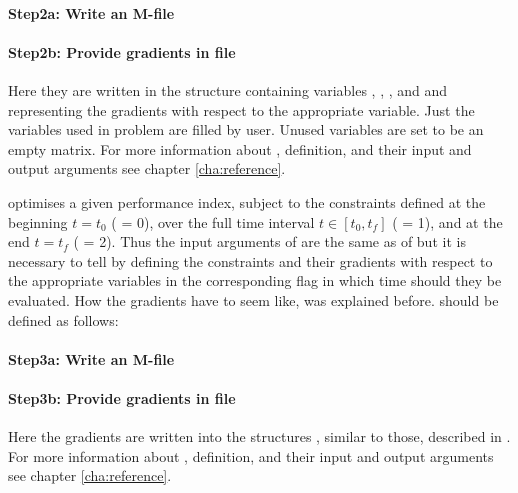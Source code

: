 \paragraph{Step2a: Write an M-file~}

{\small }

\paragraph{Step2b: Provide gradients in file~}

{\small }

Here they are written in the structure  containing
variables , , , and  and
representing the gradients with respect to the appropriate
variable. Just the variables used in problem are filled by
user. Unused variables are set to be an empty matrix. For more
information about ,  definition, and their
input and output arguments see chapter \ref{cha:reference}.

 optimises a given performance index, subject to the
constraints defined at the beginning $t =
t_{0}$ ( = 0), over the full time interval $t \in
[t_{0},t_{f}]$ ( = 1), and at the end $t = t_{f}$
( = 2). Thus the input arguments of  are the
same as of  but it is necessary to tell  by
defining the constraints and their gradients with respect to the
appropriate variables in the corresponding flag in which time should
they be evaluated. How the gradients have to seem like, was explained
before.  should be defined as follows:  
 
\paragraph{Step3a: Write an M-file~}

{\small }

\paragraph{Step3b: Provide gradients in file~}

{\small }

Here the gradients are written into the structures ,
 similar to those, described in . For more
information about ,  definition, and their
input and output arguments see chapter \ref{cha:reference}.

